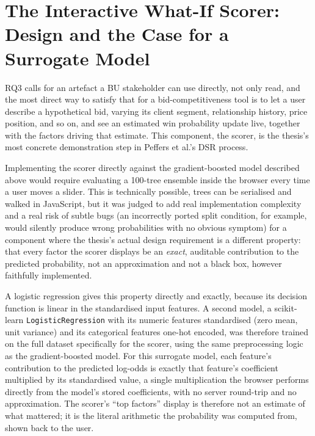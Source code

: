 \documentclass[12pt,oneside]{report}
\begin{document}
\hypertarget{the-interactive-what-if-scorer-design-and-the-case-for-a-surrogate-model}{%
\section{The Interactive What-If Scorer: Design and the Case for a
Surrogate
Model}\label{the-interactive-what-if-scorer-design-and-the-case-for-a-surrogate-model}}

RQ3 calls for an artefact a BU stakeholder can use directly, not only
read, and the most direct way to satisfy that for a bid-competitiveness
tool is to let a user describe a hypothetical bid, varying its client
segment, relationship history, price position, and so on, and see an
estimated win probability update live, together with the factors driving
that estimate. This component, the scorer, is the thesis's most concrete
demonstration step in Peffers et al.'s \citeyearpar{peffers2007design}
DSR process.

Implementing the scorer directly against the gradient-boosted model
described above would require evaluating a 100-tree ensemble inside the
browser every time a user moves a slider. This is technically possible,
trees can be serialised and walked in JavaScript, but it was judged to
add real implementation complexity and a real risk of subtle bugs (an
incorrectly ported split condition, for example, would silently produce
wrong probabilities with no obvious symptom) for a component where the
thesis's actual design requirement is a different property: that every
factor the scorer displays be an \emph{exact}, auditable contribution to
the predicted probability, not an approximation and not a black box,
however faithfully implemented.

A logistic regression gives this property directly and exactly, because
its decision function is linear in the standardised input features. A
second model, a scikit-learn \texttt{LogisticRegression} with its
numeric features standardised (zero mean, unit variance) and its
categorical features one-hot encoded, was therefore trained on the full
dataset specifically for the scorer, using the same preprocessing logic
as the gradient-boosted model. For this surrogate model, each feature's
contribution to the predicted log-odds is exactly that feature's
coefficient multiplied by its standardised value, a single
multiplication the browser performs directly from the model's stored
coefficients, with no server round-trip and no approximation. The
scorer's ``top factors'' display is therefore not an estimate of what
mattered; it is the literal arithmetic the probability was computed
from, shown back to the user.
\end{document}
